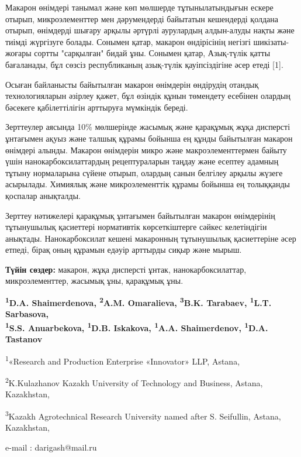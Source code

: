 Макарон өнімдері танымал және көп мөлшерде тұтынылатындығын ескере
отырып, микроэлементтер мен дәрумендерді байытатын кешендерді қолдана
отырып, өнімдерді шығару арқылы әртүрлі аурулардың алдын-алуды нақты
және тиімді жүргізуге болады. Сонымен қатар, макарон өндірісінің негізгі
шикізаты-жоғары сортты "сарқылған" бидай ұны. Сонымен қатар, Азық-түлік
қатты бағаланады, бұл сөзсіз республиканың азық-түлік қауіпсіздігіне
әсер етеді {[}1{]}.

Осыған байланысты байытылған макарон өнімдерін өндірудің отандық
технологияларын әзірлеу қажет, бұл өзіндік құнын төмендету есебінен
олардың бәсекеге қабілеттілігін арттыруға мүмкіндік береді.

Зерттеулер аясында 10\% мөлшерінде жасымық және қарақұмық жұқа дисперсті
ұнтағымен ақуыз және талшық құрамы бойынша ең құнды байытылған макарон
өнімдері алынды. Макарон өнімдерін микро және макроэлементтермен байыту
үшін нанокарбоксилаттардың рецептураларын таңдау және есептеу адамның
тұтыну нормаларына сүйене отырып, олардың санын белгілеу арқылы жүзеге
асырылады. Химиялық және микроэлементтік құрамы бойынша ең толыққанды
қоспалар анықталды.

Зерттеу нәтижелері қарақұмық ұнтағымен байытылған макарон өнімдерінің
тұтынушылық қасиеттері нормативтік көрсеткіштерге сәйкес келетіндігін
анықтады. Нанокарбоксилат кешені макаронның тұтынушылық қасиеттеріне
әсер етпеді, бірақ оның құрамын едәуір арттырды сиқыр және мырыш.

{\bfseries Түйін сөздер:} макарон, жұқа дисперсті ұнтак,
нанокарбоксилаттар, микроэлементтер, жасымық ұны, қарақұмық ұны.

\begin{center}

{\bfseries \textsuperscript{1}D.A. Shaimerdenova\envelope,
\textsuperscript{2}A.M. Omaralieva, \textsuperscript{3}B.K. Tarabaev,
\textsuperscript{1}L.T. Sarbasova,\\
\textsuperscript{1}S.S. Anuarbekova, \textsuperscript{1}D.B. Iskakova,
\textsuperscript{1}A.A. Shaimerdenov, \textsuperscript{1}D.A. Tastanov}

\textsuperscript{1}«Research and Production Enterprise «Innovator» LLP,
Astana,

\textsuperscript{2}K.Kulazhanov Kazakh University of Technology and
Business, Astana, Kazakhstan,

\textsuperscript{3}Kazakh Agrotechnical Research University named after
S. Seifullin, Astana, Kazakhstan,

e-mail : darigash@mail.ru
\end{center}

